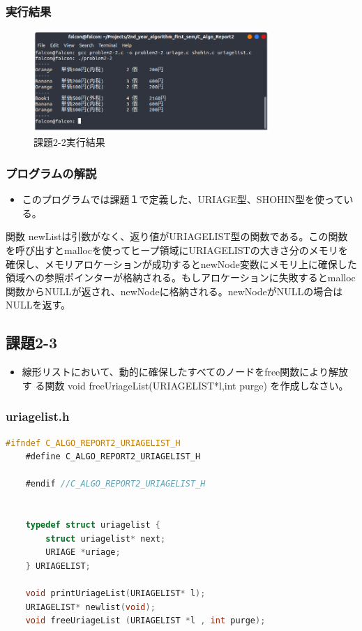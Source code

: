 \documentclass[10pt]{article}
\begin{document}
\subsubsection{実行結果}
\begin{figure}[H]
	\centering
	\includegraphics[width=0.8\textwidth]{problem2-2.png}
	\caption{課題2-2実行結果}
\end{figure}

\subsubsection{プログラムの解説}
\begin{itemize}
    \item このプログラムでは課題１で定義した、URIAGE型、SHOHIN型を使っている。
\end{itemize}
関数 newListは引数がなく、返り値がURIAGELIST型の関数である。この関数を呼び出すとmallocを使ってヒープ領域にURIAGELISTの大きさ分のメモリを確保し、メモリアロケーションが成功するとnewNode変数にメモリ上に確保した領域への参照ポインターが格納される。もしアロケーションに失敗するとmalloc関数からNULLが返され、newNodeに格納される。newNodeがNULLの場合はNULLを返す。


\subsection{課題2-3}
\begin{itemize}
    \item 線形リストにおいて、動的に確保したすべてのノードをfree関数により解放す る関数 void freeUriageList(URIAGELIST*l,int purge) を作成しなさい。
\end{itemize}
\subsubsection{uriagelist.h}
\begin{lstlisting}[language=C]
    #ifndef C_ALGO_REPORT2_URIAGELIST_H
    #define C_ALGO_REPORT2_URIAGELIST_H
    
    #endif //C_ALGO_REPORT2_URIAGELIST_H
    
    
    typedef struct uriagelist {
        struct uriagelist* next;
        URIAGE *uriage;
    } URIAGELIST;
    
    void printUriageList(URIAGELIST* l);
    URIAGELIST* newlist(void);
    void freeUriageList (URIAGELIST *l , int purge);
\end{lstlisting}
\end{document}
